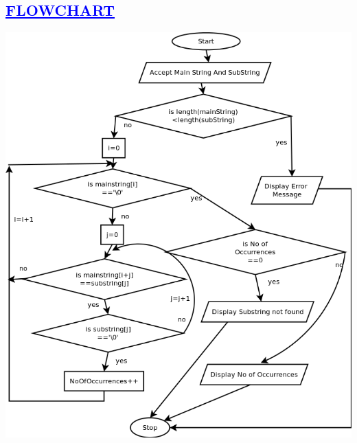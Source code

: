 \documentclass[a4paper,12pt]{report}
\begin{document}
\begin{center}
\chapter{\textcolor{blue}{\underline {FLOWCHART}}}


 \includegraphics[width=15 cm,height=13 cm]{./Diagram1.png}
\end{center}
\end{document}
